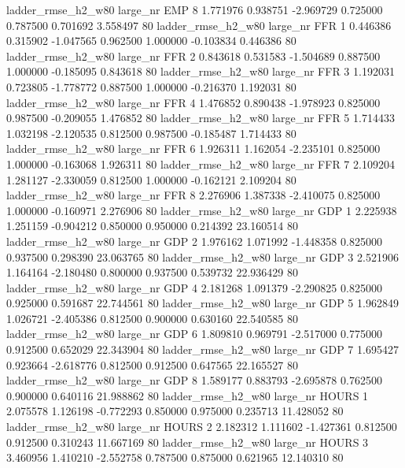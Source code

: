  ladder_rmse_h2_w80   large_nr      EMP                 8  1.771976  0.938751  -2.969729 0.725000 0.787500  0.701692    3.558497 80
 ladder_rmse_h2_w80   large_nr      FFR                 1  0.446386  0.315902  -1.047565 0.962500 1.000000 -0.103834    0.446386 80
 ladder_rmse_h2_w80   large_nr      FFR                 2  0.843618  0.531583  -1.504689 0.887500 1.000000 -0.185095    0.843618 80
 ladder_rmse_h2_w80   large_nr      FFR                 3  1.192031  0.723805  -1.778772 0.887500 1.000000 -0.216370    1.192031 80
 ladder_rmse_h2_w80   large_nr      FFR                 4  1.476852  0.890438  -1.978923 0.825000 0.987500 -0.209055    1.476852 80
 ladder_rmse_h2_w80   large_nr      FFR                 5  1.714433  1.032198  -2.120535 0.812500 0.987500 -0.185487    1.714433 80
 ladder_rmse_h2_w80   large_nr      FFR                 6  1.926311  1.162054  -2.235101 0.825000 1.000000 -0.163068    1.926311 80
 ladder_rmse_h2_w80   large_nr      FFR                 7  2.109204  1.281127  -2.330059 0.812500 1.000000 -0.162121    2.109204 80
 ladder_rmse_h2_w80   large_nr      FFR                 8  2.276906  1.387338  -2.410075 0.825000 1.000000 -0.160971    2.276906 80
 ladder_rmse_h2_w80   large_nr      GDP                 1  2.225938  1.251159  -0.904212 0.850000 0.950000  0.214392   23.160514 80
 ladder_rmse_h2_w80   large_nr      GDP                 2  1.976162  1.071992  -1.448358 0.825000 0.937500  0.298390   23.063765 80
 ladder_rmse_h2_w80   large_nr      GDP                 3  2.521906  1.164164  -2.180480 0.800000 0.937500  0.539732   22.936429 80
 ladder_rmse_h2_w80   large_nr      GDP                 4  2.181268  1.091379  -2.290825 0.825000 0.925000  0.591687   22.744561 80
 ladder_rmse_h2_w80   large_nr      GDP                 5  1.962849  1.026721  -2.405386 0.812500 0.900000  0.630160   22.540585 80
 ladder_rmse_h2_w80   large_nr      GDP                 6  1.809810  0.969791  -2.517000 0.775000 0.912500  0.652029   22.343904 80
 ladder_rmse_h2_w80   large_nr      GDP                 7  1.695427  0.923664  -2.618776 0.812500 0.912500  0.647565   22.165527 80
 ladder_rmse_h2_w80   large_nr      GDP                 8  1.589177  0.883793  -2.695878 0.762500 0.900000  0.640116   21.988862 80
 ladder_rmse_h2_w80   large_nr    HOURS                 1  2.075578  1.126198  -0.772293 0.850000 0.975000  0.235713   11.428052 80
 ladder_rmse_h2_w80   large_nr    HOURS                 2  2.182312  1.111602  -1.427361 0.812500 0.912500  0.310243   11.667169 80
 ladder_rmse_h2_w80   large_nr    HOURS                 3  3.460956  1.410210  -2.552758 0.787500 0.875000  0.621965   12.140310 80
